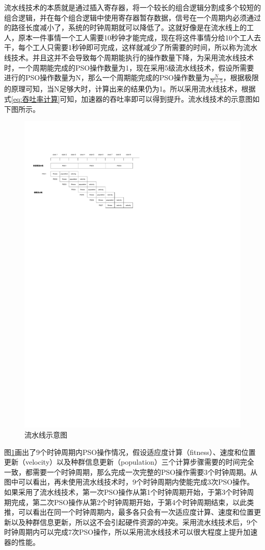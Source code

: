 流水线技术的本质就是通过插入寄存器，将一个较长的组合逻辑分割成多个较短的组合逻辑，并在每个组合逻辑中使用寄存器暂存数据，信号在一个周期内必须通过的路径长度减小了，系统的时钟周期就可以降低了。这就好像是在流水线上的工人，原本一件事情一个工人需要10秒钟才能完成，现在将这件事情分给10个工人去干，每个工人只需要1秒钟即可完成，这样就减少了所需要的时间，所以称为流水线技术。并且这并不会导致每个周期能执行的操作数量下降，为采用流水线技术时，一个周期能完成的PSO操作数量为1，现在采用5级流水线技术，假设所需要进行的PSO操作数量为N，那么一个周期能完成的PSO操作数量为$\frac{N}{N+5}$，根据极限的原理可知，当N足够大时，计算出来的结果仍为1。所以采用流水线技术，根据式\eqref{eq:吞吐率计算}可知，加速器的吞吐率即可以得到提升。流水线技术的示意图如下图所示。
\begin{figure}[htb]
    \centering
    \includegraphics[width=12cm]{fig/5-fig/流水线示意图.drawio.pdf}
    \caption{流水线示意图}
    \label{fig:流水线示意图}
  \end{figure}

图\ref{fig:流水线示意图}画出了9个时钟周期内PSO操作情况，假设适应度计算（fitness）、速度和位置更新（velocity）以及种群信息更新（population）三个计算步骤需要的时间完全一致，都需要一个时钟周期，那么完成一次完整的PSO操作需要3个时钟周期。从图中可以看出，再未使用流水线技术时，9个时钟周期内使能完成3次PSO操作。如果采用了流水线技术，第一次PSO操作从第1个时钟周期开始，于第3个时钟周期完成，第二次PSO操作从第2个时钟周期开始，于第4个时钟周期结束，以此类推，可以看出在同一个时钟周期内，最多各只会有一次适应度计算、速度和位置更新以及种群信息更新，所以这不会引起硬件资源的冲突。采用流水线技术后，9个时钟周期内可以完成7次PSO操作，所以采用流水线技术可以很大程度上提升加速器的性能。

